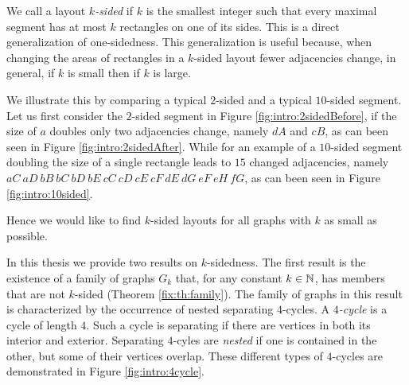   We call a layout \emph{$k$-sided} if $k$ is the smallest integer such that every maximal segment has at most $k$ rectangles on one of its sides. This is a direct generalization of one-sidedness.
  This generalization is useful because, when changing the areas of rectangles in a $k$-sided layout fewer adjacencies change, in general, if $k$ is small then if $k$ is large.

  We illustrate this by comparing a typical $2$-sided and a typical $10$-sided segment.
  Let us first consider the $2$-sided segment in Figure \ref{fig:intro:2sidedBefore}, if the size of $a$ doubles only two adjacencies change, namely $dA$ and $cB$, as can been seen in Figure \ref{fig:intro:2sidedAfter}.
  While for an example of a $10$-sided segment doubling the size of a single rectangle leads to $15$ changed adjacencies, namely $aC\ aD\ bB\ bC\ bD\ bE\ cC\ cD\ cE\ cF\ dE\ dG\ eF\ eH\ fG$, as can been seen in Figure \ref{fig:intro:10sided}.

  Hence we would like to find $k$-sided layouts for all graphs with $k$ as small as possible.


  In this thesis we provide two results on $k$-sidedness. The first result is the existence of a family of graphs $G_k$ that, for any constant $k \in \mathbb{N}$, has members that are not $k$-sided (Theorem \ref{fix:th:family}). The family of graphs in this result is characterized by the occurrence of nested separating $4$-cycles.
  A \emph{$4$-cycle} is a cycle of length $4$.
  Such a cycle is separating if there are vertices in both its interior and exterior.
  Separating $4$-cyles are \emph{nested} if one is contained in the other, but some of their vertices overlap. These different types of $4$-cycles are demonstrated in Figure \ref{fig:intro:4cycle}.

